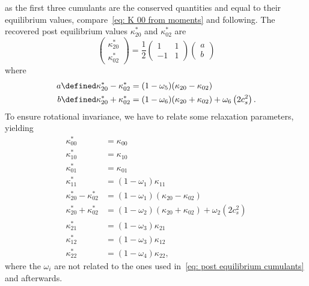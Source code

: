 as the first three cumulants are the conserved quantities and equal to their equilibrium values, compare~\eqref{eq: K 00 from moments} and following.
The recovered post equilibrium values $\kappa_{20}^{*}$ and $\kappa_{02}^{*}$ are
\begin{equation}
  \begin{pmatrix}
    \kappa_{20}^{*} \\
    \kappa_{02}^{*}
  \end{pmatrix}
  = \frac{1}{2}
  \begin{pmatrix}
    1 & 1 \\ -1 & 1
  \end{pmatrix}
  \begin{pmatrix}
    a\\
    b
  \end{pmatrix}
\end{equation}
where
\begin{equation}
 \begin{aligned}
   a \defined \kappa_{20}^{*} - \kappa_{02}^{*}
     & = (1-\omega_5) (\kappa_{20} - \kappa_{02}) \\
   b \defined \kappa_{20}^{*} + \kappa_{02}^{*}
     & = (1-\omega_6)(\kappa_{20} + \kappa_{02}) + \omega_6 \left( 2 c_s^2 \right).
 \end{aligned}
\end{equation}
To ensure rotational invariance, we have to relate some relaxation parameters, yielding
\begin{equation}
  \label{eq: collision equation system full}
  \begin{aligned}
    \kappa_{00}^{*} & = \kappa_{00} \\
    \kappa_{10}^{*} & = \kappa_{10} \\
    \kappa_{01}^{*} & = \kappa_{01} \\
    \kappa_{11}^{*} & = (1-\omega_1)\kappa_{11} \\
    \kappa_{20}^{*} - \kappa_{02}^{*}
      & = (1-\omega_1) (\kappa_{20} - \kappa_{02}) \\
    \kappa_{20}^{*} + \kappa_{02}^{*}
      & = (1-\omega_2)(\kappa_{20} + \kappa_{02}) + \omega_2 \left( 2 c_s^2 \right) \\
    \kappa_{21}^{*} & = (1-\omega_3)\kappa_{21} \\
    \kappa_{12}^{*} & = (1-\omega_3)\kappa_{12} \\
    \kappa_{22}^{*} & = (1-\omega_4)\kappa_{22},
  \end{aligned}
\end{equation}
where the $\omega_i$ are not related to the ones used in~\eqref{eq: post equilibrium cumulants} and afterwards.
